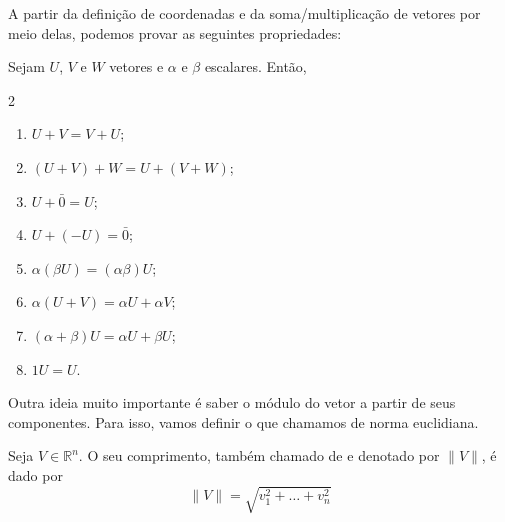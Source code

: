 \documentclass[../main.tex]{subfiles}
\begin{document}
		A partir da definição de coordenadas e da soma/multiplicação de vetores por meio delas, podemos provar as seguintes propriedades:
		\begin{teorema}
			Sejam $U$, $V$ e $W$ vetores e $\alpha$ e $\beta$ escalares. Então,
			\begin{multicols}{2}
				\begin{enumerate}[label=\roman*)]
					\item $U+V=V+U$;
					\item $(U+V)+W=U+(V+W)$;
					\item $U+\bar{0}=U$;
					\item $U+(-U)=\bar{0}$;
					\item $\alpha(\beta U)=(\alpha \beta)U$;
					\item $\alpha(U+V)=\alpha U+\alpha V$;
					\item $(\alpha+\beta)U=\alpha U+\beta U$;
					\item $1U=U$.
				\end{enumerate}
			\end{multicols}
			\label{teo:vetores8axiomas}
		\end{teorema}
		
		Outra ideia muito importante é saber o módulo do vetor a partir de seus componentes. Para isso, vamos definir o que chamamos de norma euclidiana.
		\begin{definicao}
			Seja $V\in \mathbb{R}^n$. O seu comprimento, também chamado de  e denotado por $\|V\|$, é dado por
			\[
			\|V\|=\sqrt{v_1^2 +\dots + v_n^2}
			\]
		\end{definicao}
		
\end{document}
